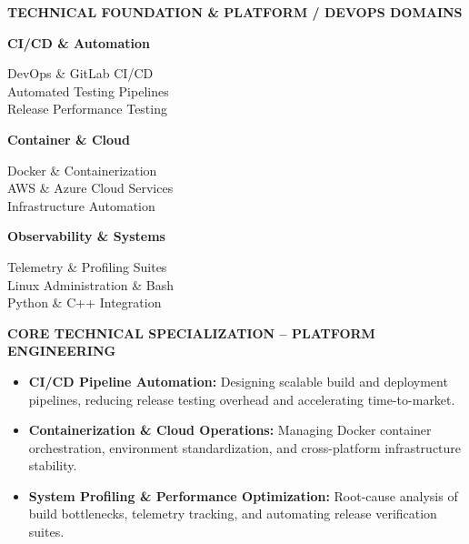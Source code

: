 \documentclass[10pt,a4paper]{article}
\begin{document}
\colorbox{primary!10}{%
\parbox{\dimexpr\textwidth-2\fboxsep\relax}{%
    \vspace{0.10cm}
    \centering
    {\bfseries\color{primary} TECHNICAL FOUNDATION \& PLATFORM / DEVOPS DOMAINS\par}
    \vspace{0.08cm}

    \begin{minipage}[t]{0.31\linewidth}
        \raggedright
        \textbf{\color{primary}CI/CD \& Automation}\par
        DevOps \& GitLab CI/CD\\
        Automated Testing Pipelines\\
        Release Performance Testing
    \end{minipage}
    \hfill
    \begin{minipage}[t]{0.31\linewidth}
        \raggedright
        \textbf{\color{primary}Container \& Cloud}\par
        Docker \& Containerization\\
        AWS \& Azure Cloud Services\\
        Infrastructure Automation
    \end{minipage}
    \hfill
    \begin{minipage}[t]{0.31\linewidth}
        \raggedright
        \textbf{\color{primary}Observability \& Systems}\par
        Telemetry \& Profiling Suites\\
        Linux Administration \& Bash\\
        Python \& C++ Integration
    \end{minipage}

    \vspace{0.08cm}
}%
}

\vspace{0.15cm}

{\centering
\colorbox{accent!25}{%
\parbox{\dimexpr\textwidth-25\fboxsep\relax}{%
    \vspace{0.08cm}
    \centering
    {\bfseries\color{primary}CORE TECHNICAL SPECIALIZATION -- PLATFORM ENGINEERING\par}
    \vspace{0.05cm}
    \raggedright
    \begin{itemize}[leftmargin=1.5em, itemsep=0.15em, topsep=0.15em]
        \item \textbf{\color{primary}CI/CD Pipeline Automation:} Designing scalable build and deployment pipelines, reducing release testing overhead and accelerating time-to-market.
        \item \textbf{\color{primary}Containerization \& Cloud Operations:} Managing Docker container orchestration, environment standardization, and cross-platform infrastructure stability.
        \item \textbf{\color{primary}System Profiling \& Performance Optimization:} Root-cause analysis of build bottlenecks, telemetry tracking, and automating release verification suites.
    \end{itemize}
    \vspace{0.05cm}
}%
}\par}
\end{document}
